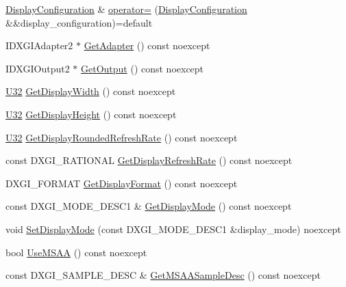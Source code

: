 \begin{DoxyCompactItemize}
\hyperlink{structmage_1_1_display_configuration}{Display\+Configuration} \& \hyperlink{structmage_1_1_display_configuration_a56c175220b8f597afd7d5d6275b5d0de}{operator=} (\hyperlink{structmage_1_1_display_configuration}{Display\+Configuration} \&\&display\+\_\+configuration)=default
\item 
I\+D\+X\+G\+I\+Adapter2 $\ast$ \hyperlink{structmage_1_1_display_configuration_a415acc2cba9d5f28dc42073bb69fbac2}{Get\+Adapter} () const noexcept
\item 
I\+D\+X\+G\+I\+Output2 $\ast$ \hyperlink{structmage_1_1_display_configuration_aa328570fbfc6456c0e5d90e738aec81b}{Get\+Output} () const noexcept
\item 
\hyperlink{namespacemage_a41c104c036fba3756a74e19f793eeaa1}{U32} \hyperlink{structmage_1_1_display_configuration_a702c5b21341cd347d94b576a4cf3740a}{Get\+Display\+Width} () const noexcept
\item 
\hyperlink{namespacemage_a41c104c036fba3756a74e19f793eeaa1}{U32} \hyperlink{structmage_1_1_display_configuration_a20ad8e0f250a4e6d144f06b6042a7dee}{Get\+Display\+Height} () const noexcept
\item 
\hyperlink{namespacemage_a41c104c036fba3756a74e19f793eeaa1}{U32} \hyperlink{structmage_1_1_display_configuration_aada8415f1dbebb7f24decc2d5bf030ab}{Get\+Display\+Rounded\+Refresh\+Rate} () const noexcept
\item 
const D\+X\+G\+I\+\_\+\+R\+A\+T\+I\+O\+N\+AL \hyperlink{structmage_1_1_display_configuration_aa92237613f8077d189f9504fec371cb8}{Get\+Display\+Refresh\+Rate} () const noexcept
\item 
D\+X\+G\+I\+\_\+\+F\+O\+R\+M\+AT \hyperlink{structmage_1_1_display_configuration_a412215b18edac3ec6bf18cd00d8c689b}{Get\+Display\+Format} () const noexcept
\item 
const D\+X\+G\+I\+\_\+\+M\+O\+D\+E\+\_\+\+D\+E\+S\+C1 \& \hyperlink{structmage_1_1_display_configuration_a20270be6a17deab929fce25596edabd4}{Get\+Display\+Mode} () const noexcept
\item 
void \hyperlink{structmage_1_1_display_configuration_a23401fc0c20d52d44480c32fc6020e85}{Set\+Display\+Mode} (const D\+X\+G\+I\+\_\+\+M\+O\+D\+E\+\_\+\+D\+E\+S\+C1 \&display\+\_\+mode) noexcept
\item 
bool \hyperlink{structmage_1_1_display_configuration_a7bf7445c7242fc8d943b04d1975cfa72}{Use\+M\+S\+AA} () const noexcept
\item 
const D\+X\+G\+I\+\_\+\+S\+A\+M\+P\+L\+E\+\_\+\+D\+E\+SC \& \hyperlink{structmage_1_1_display_configuration_a254a0752dd6d1ec68121cd6495a10a02}{Get\+M\+S\+A\+A\+Sample\+Desc} () const noexcept

\end{DoxyCompactItemize}
